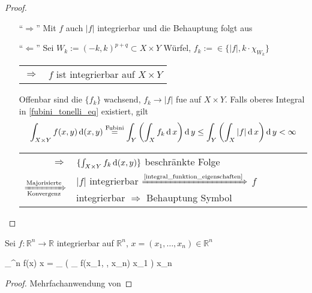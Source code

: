 \begin{proof}\hspace*{0pt}
	\NoEndMark
	\begin{itemize}
		\item["`$\Rightarrow$"'] Mit $f$ auch $\vert f \vert$ integrierbar und die Behauptung folgt aus 
		
		\item["`$\Leftarrow$"'] Sei $W_k := (-k,k)^{p+q}\subset X\times Y$ Würfel, $f_k := \in \{ \vert f \vert, k\cdot \chi_{W_k} \}$ \\
		\begin{tabularx}{\linewidth}{r@{\ \ }X}
		$\Rightarrow$ & $f$ ist integrierbar auf $X\times Y$
		\end{tabularx}
		
		Offenbar sind die $\{ f_k \}$ wachsend, $f_k\to \vert f \vert$ \gls{fue} auf $X\times Y$. Falls oberes Integral in \eqref{fubini_tonelli_eq} existiert, gilt \begin{align*}
			\int_{X\times Y} f(x,y) \operatorname{d}(x,y) \overset{\text{Fubini}}{=} \int_Y \left( \int_X f_k \operatorname{d} x\right) \operatorname{d} y \le \int_Y \left( \int_X \vert f \vert \operatorname{d} x \right)\operatorname{d} y < \infty
		\end{align*}
		\begin{tabularx}{\linewidth}{r@{\ \ }X}
		$\Rightarrow$ & $\{\int_{X\times Y} f_k \operatorname{d} (x,y)\}$ beschränkte Folge \\
		$\xRightarrow[\text{Konvergenz}]{\text{Majorisierte}}$ & $\vert f \vert$ integrierbar $\xRightarrow{\text{\cref{integral_funktion_eigenschaften}}}$ $f$ integrierbar $\Rightarrow$ Behauptung \hfill\csname\InTheoType Symbol\endcsname
	\end{tabularx}
	\end{itemize}
\end{proof}

\begin{conclusion}
	Sei $f:\mathbb{R}^n\to\mathbb{R}$ integrierbar auf $\mathbb{R}^n$, $x = (x_1, \dotsc, x_n)\in\mathbb{R}^n$
	\begin{flalign}
		\Rightarrow\;\;\int_{^n} f(x) \D x = \int_ \dotsc \left( \int_ f(x_1, \dotsc, x_n) \D x_1 \right) \dotsc \D x_n
	\end{flalign}
\end{conclusion}
\begin{proof}
	Mehrfachanwendung von 
\end{proof}

